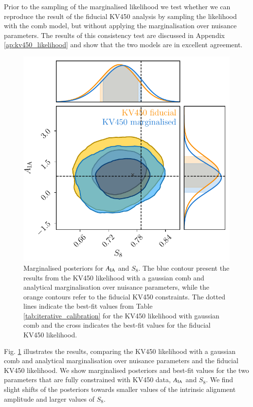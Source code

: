 \documentclass{aa}
\begin{document}
Prior to the sampling of the marginalised likelihood we test whether we can reproduce the result of the fiducial KV450 analysis by sampling the likelihood with the comb model, but without applying the marginalisation over nuisance parameters. The results of this consistency test are discussed in Appendix \ref{ap:kv450_likelihood} and show that the two models are in excellent agreement. 
\begin{figure}
\centering
\includegraphics[width=\linewidth]{plots/AIA_vs_S8}
\caption{Marginalised posteriors for $A_{\rm IA}$ and $S_8$. The blue contour present the results from the KV450 likelihood with a gaussian comb and analytical marginalisation over nuisance parameters, while the orange contours refer to the fiducial KV450 constraints. The dotted lines indicate the best-fit values from Table \ref{tab:iterative_calibration} for the KV450 likelihood with gaussian comb and the cross indicates the best-fit values for the fiducial KV450 likelihood.}
\label{fig:AIA_vs_S8}
\end{figure}

Fig. \ref{fig:AIA_vs_S8} illustrates the results, comparing the KV450 likelihood with a gaussian comb and analytical marginalisation over nuisance parameters and the fiducial KV450 likelihood. We show marginalised posteriors and best-fit values for the two parameters that are fully constrained with KV450 data, $A_{\rm IA}$ and $S_8$. We find slight shifts of the posteriors towards smaller values of the intrinsic alignment amplitude and larger values of $S_8$. 
\end{document}
